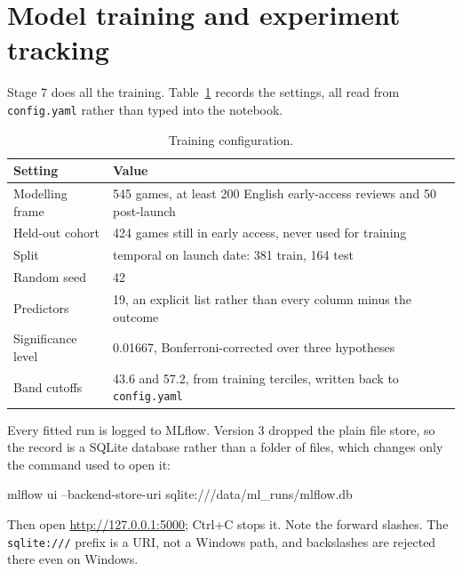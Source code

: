 \section{Model training and experiment tracking}
\label{sec:mlflow}

Stage 7 does all the training. Table~\ref{tab:training} records the settings, all read from
\texttt{config.yaml} rather than typed into the notebook.

\begin{table}[htbp]
\centering
\caption{Training configuration.}
\label{tab:training}
\small
\begin{tabular}{|p{4.0cm}|p{10.0cm}|}
\hline
\textbf{Setting} & \textbf{Value} \\
\hline
Modelling frame & 545 games, at least 200 English early-access reviews and 50 post-launch \\
\hline
Held-out cohort & 424 games still in early access, never used for training \\
\hline
Split & temporal on launch date: 381 train, 164 test \\
\hline
Random seed & 42 \\
\hline
Predictors & 19, an explicit list rather than every column minus the outcome \\
\hline
Significance level & 0.01667, Bonferroni-corrected over three hypotheses \\
\hline
Band cutoffs & 43.6 and 57.2, from training terciles, written back to \texttt{config.yaml} \\
\hline
\end{tabular}
\end{table}

Every fitted run is logged to MLflow. Version 3 dropped the plain file store, so the record is a
SQLite database rather than a folder of files, which changes only the command used to open it:

\begin{cmd}
mlflow ui --backend-store-uri sqlite:///data/ml_runs/mlflow.db
\end{cmd}

\noindent Then open \url{http://127.0.0.1:5000}; Ctrl+C stops it. Note the forward slashes. The
\texttt{sqlite:///} prefix is a URI, not a Windows path, and backslashes are rejected there even on
Windows.


